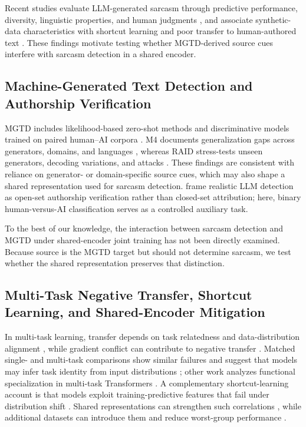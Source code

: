 \documentclass[11pt]{article}
\begin{document}
Recent studies evaluate LLM-generated sarcasm through predictive performance, diversity, linguistic properties, and human judgments \citep{majer2026multi}, and associate synthetic-data characteristics with shortcut learning and poor transfer to human-authored text \citep{mahato2026llms}. These findings motivate testing whether MGTD-derived source cues interfere with sarcasm detection in a shared encoder.

\subsection{Machine-Generated Text Detection and Authorship Verification}
\label{sec:related-ai}

MGTD includes likelihood-based zero-shot methods \citep{mitchell2023detectgpt} and discriminative models trained on paired human--AI corpora \citep[HC3;][]{guo2023hc3}. M4 documents generalization gaps across generators, domains, and languages \citep{wang2024m4}, whereas RAID stress-tests unseen generators, decoding variations, and attacks \citep{dugan2024raid}. These findings are consistent with reliance on generator- or domain-specific source cues, which may also shape a shared representation used for sarcasm detection. \citet{bevendorff2025} frame realistic LLM detection as open-set authorship verification rather than closed-set attribution; here, binary human-versus-AI classification serves as a controlled auxiliary task.

To the best of our knowledge, the interaction between sarcasm detection and MGTD under shared-encoder joint training has not been directly examined. Because source is the MGTD target but should not determine sarcasm, we test whether the shared representation preserves that distinction.

\subsection{Multi-Task Negative Transfer, Shortcut Learning, and Shared-Encoder Mitigation}
\label{sec:related-transfer}

In multi-task learning, transfer depends on task relatedness and data-distribution alignment \citep{zhang2023survey,wu2020understanding}, while gradient conflict can contribute to negative transfer \citep{yu2020gradientsurgery,liu2021cagrad}. Matched single- and multi-task comparisons show similar failures and suggest that models may infer task identity from input distributions \citep{mueller2022taskconflict}; other work analyzes functional specialization in multi-task Transformers \citep{he2021stemcell,li2023functional}. A complementary shortcut-learning account is that models exploit training-predictive features that fail under distribution shift \citep{geirhos2020shortcut,ye2024spurious}. Shared representations can strengthen such correlations \citep{hu2022spurious,chai2025spurious}, while additional datasets can introduce them and reduce worst-group performance \citep{compton2023morisless}.
\end{document}
